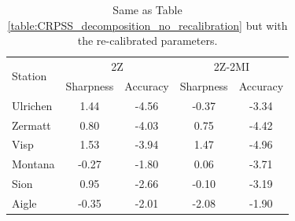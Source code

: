 \documentclass[hess]{copernicus}
\begin{document}
\begin{table}[htb]
	\caption{Same as Table \ref{table:CRPSS_decomposition_no_recalibration} but with the re-calibrated parameters.}
	\begin{center}
		\begin{tabular}{l c c c c}
			\hline
			\multirow{2}{*}{Station} & \multicolumn{2}{c}{2Z} & \multicolumn{2}{c}{2Z-2MI} \\
			& Sharpness & Accuracy & Sharpness & Accuracy \\
			\hline
			Ulrichen & 1.44 & -4.56 & -0.37 & -3.34 \\
			Zermatt & 0.80 & -4.03 & 0.75 & -4.42 \\
			Visp & 1.53 & -3.94 & 1.47 & -4.96 \\
			Montana & -0.27 & -1.80 & 0.06 & -3.71 \\
			Sion & 0.95 & -2.66 & -0.10 & -3.19 \\
			Aigle & -0.35 & -2.01 & -2.08 & -1.90 \\ 
			\hline
		\end{tabular}
	\end{center}
	\label{table:CRPSS_decomposition_recalibration}
\end{table}
\end{document}
